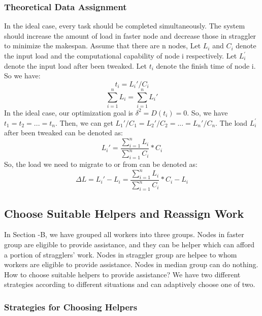\documentclass[10pt,conference,compsocconf,letterpaper]{IEEEtran}
\begin{document}
\subsubsection{Theoretical Data Assignment}

  In the ideal case, every task should be completed simultaneously. The system should increase the amount of load in faster node and decrease those in straggler to minimize the makespan. Assume that there are n nodes, Let \emph{$L_i$} and \emph{$C_i$} denote the input load and the computational capability of node i respectively. Let \emph{$L_i^\prime$} denote the input load after been tweaked. Let $t_i$ denote the finish time of node i. So we have:
  \begin{equation}
  t_i = L_i\prime / C_i
  \end{equation}
  \begin{equation}
  \sum_{i=1}^n L_i = \sum_{i=1}^n L_i\prime
  \end{equation}
  In the ideal case, our optimization goal is $\delta^{2}=D(t_i)=0$. So, we have $t_1=t_2=...=t_n$. Then, we can get $L_1\prime/C_1=L_2\prime/C_2=...=L_n\prime/C_n$. The load \emph{$L_i^\prime$} after been tweaked can be denoted as:
  \begin{equation}
  L_i\prime =  \frac{\sum_{i=1}^n L_i}{\sum_{i=1}^n C_i}*C_i
  \end{equation}
  So, the load we need to migrate to or from can be denoted as:
  \begin{equation}
  \Delta L = L_i\prime - L_i = \frac{\sum_{i=1}^n L_i}{\sum_{i=1}^n C_i}*C_i - L_i
  \end{equation}

\subsection{Choose Suitable Helpers and Reassign Work}

  In Section \uppercase\expandafter{}-B, we have grouped all workers into three groups. Nodes in faster group are eligible to provide assistance, and they can be helper which can afford a portion of stragglers' work. Nodes in straggler group are helpee to whom workers are eligible to provide assistance. Nodes in median group can do nothing. How to choose suitable helpers to provide assistance? We have two different strategies according to different situations and can adaptively choose one of two.

\subsubsection{Strategies for Choosing Helpers}
\end{document}
